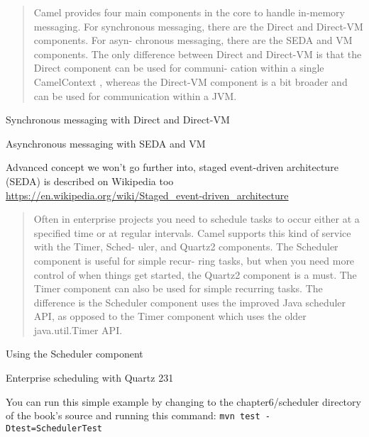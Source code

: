 \documentclass[Screen16to9,17pt]{foils}
\begin{document}
\begin{quote}
  Camel provides four main components in the core to handle in-­memory messaging.
For synchronous messaging, there are the Direct and Direct-­VM components. For asyn-
chronous messaging, there are the SEDA and VM components. The only difference
between Direct and Direct-­VM is that the Direct component can be used for communi-
cation within a single CamelContext , whereas the Direct-­VM component is a bit broader
and can be used for communication within a JVM.
\end{quote}

\begin{list2}
\item Synchronous messaging with Direct and Direct-­VM
\item Asynchronous messaging with SEDA and VM
\end{list2}

Advanced concept we won't go further into, staged event-­driven architecture (SEDA) is described on Wikipedia too \url{https://en.wikipedia.org/wiki/Staged_event-­driven_architecture}






\begin{quote}
  Often in enterprise projects you need to schedule tasks to occur either at a specified
  time or at regular intervals. Camel supports this kind of service with the Timer, Sched-
  uler, and Quartz2 components. The Scheduler component is useful for simple recur-
  ring tasks, but when you need more control of when things get started, the Quartz2
  component is a must. The Timer component can also be used for simple recurring
  tasks. The difference is the Scheduler component uses the improved Java scheduler
  API, as opposed to the Timer component which uses the older java.util.Timer API.
\end{quote}

\begin{list2}
\item Using the Scheduler component
\item Enterprise scheduling with Quartz 231
\end{list2}



You can run this simple example by changing to the chapter6/scheduler directory of
the book’s source and running this command:
\verb+mvn test -Dtest=SchedulerTest+
\end{document}
